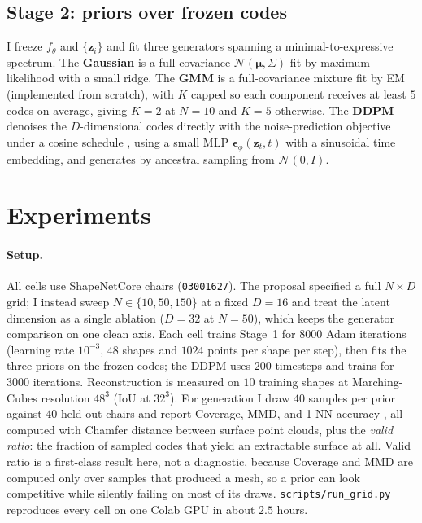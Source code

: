 \documentclass[11pt]{article}
\begin{document}
\subsection{Stage 2: priors over frozen codes}
I freeze $f_\theta$ and $\{\mathbf{z}_i\}$ and fit three generators spanning a
minimal-to-expressive spectrum. The \textbf{Gaussian} is a full-covariance
$\mathcal{N}(\boldsymbol{\mu},\Sigma)$ fit by maximum likelihood with a small
ridge. The \textbf{GMM} is a full-covariance mixture fit by EM (implemented from
scratch), with $K$ capped so each component receives at least $5$ codes on
average, giving $K=2$ at $N=10$ and $K=5$ otherwise. The \textbf{DDPM} denoises
the $D$-dimensional codes directly with the noise-prediction objective
\citep{ho2020ddpm} under a cosine schedule \citep{nichol2021improvedddpm}, using
a small MLP $\boldsymbol{\epsilon}_\phi(\mathbf{z}_t,t)$ with a sinusoidal time
embedding, and generates by ancestral sampling from $\mathcal{N}(0,I)$.

\section{Experiments}

\paragraph{Setup.} All cells use ShapeNetCore chairs
\citep{chang2015shapenet} (\texttt{03001627}). The
proposal specified a full $N\times D$ grid; I instead sweep $N \in
\{10,50,150\}$ at a fixed $D=16$ and treat the latent dimension as a single
ablation ($D=32$ at $N=50$), which keeps the generator comparison on one clean
axis. Each cell trains Stage~1 for $8000$ Adam iterations (learning rate
$10^{-3}$, $48$ shapes and $1024$ points per shape per step), then fits the three
priors on the frozen codes; the DDPM uses $200$ timesteps and trains for $3000$
iterations. Reconstruction is measured on $10$ training shapes at Marching-Cubes
resolution $48^3$ (IoU at $32^3$). For generation I draw $40$ samples per prior
against $40$ held-out chairs and report Coverage, MMD, and 1-NN accuracy
\citep{achlioptas2018latentpc}, all computed with Chamfer distance between
surface point clouds, plus the \emph{valid ratio}: the fraction of sampled codes
that yield an extractable surface at all. Valid ratio is a first-class result
here, not a diagnostic, because Coverage and MMD are computed only over samples
that produced a mesh, so a prior can look competitive while silently failing on
most of its draws. \texttt{scripts/run\_grid.py} reproduces every cell on one
Colab GPU in about $2.5$ hours.
\end{document}
